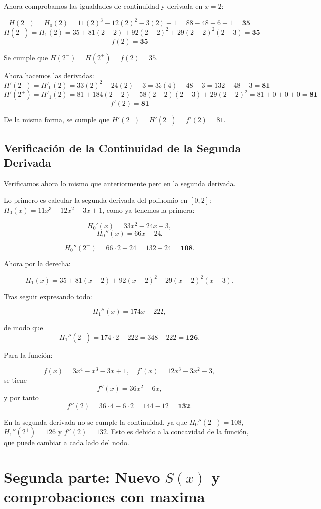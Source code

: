 \documentclass{article}
\begin{document}
Ahora comprobamos las igualdades de continuidad y derivada en \(x=2\):

$$ H(2^-) = H_0(2) = 11(2)^3 - 12(2)^2 - 3(2) + 1  = 88 - 48 - 6 + 1 = \mathbf{35} $$
$$ H(2^+) = H_1(2) = 35 + 81(2-2) + 92(2-2)^2 + 29(2-2)^2(2-3) =  \mathbf{35} $$
$$ f(2) = \mathbf{35} $$

Se cumple que \(H(2^-) = H(2^+) = f(2) = 35\).

Ahora hacemos las derivadas:
$$ H'(2^-) = H'_0(2) = 33(2)^2 - 24(2) - 3 = 33(4) - 48 - 3 = 132 - 48 - 3 = \mathbf{81} $$
$$ H'(2^+) = H'_1(2) = 81 + 184(2-2) + 58(2-2)(2-3) + 29(2-2)^2 = 81 + 0 + 0 + 0 = \mathbf{81} $$
$$ f'(2) = \mathbf{81} $$

De la misma forma, se cumple que \(H'(2^-) = H'(2^+) = f'(2) = 81\).

\subsection{Verificación de la Continuidad de la Segunda Derivada}

Verificamos ahora lo mismo que anteriormente pero en la segunda derivada.

Lo primero es calcular la segunda derivada del polinomio en \([0,2]\): \(H_0(x)=11x^3-12x^2-3x+1\), como ya tenemos la primera:

\[
H_0'(x)=33x^2-24x-3,
\]
\[
H_0''(x)=66x-24.
\]

\[
H_0''(2^-) = 66\cdot2 - 24 = 132 - 24 = \mathbf{108}.
\]

Ahora por la derecha:

\[
H_1(x) = 35 + 81(x-2) + 92(x-2)^2 + 29(x-2)^2(x-3).
\]

Tras seguir expresando todo:

\[
H_1''(x) = 174x - 222,
\]

de modo que
\[
H_1''(2^+) = 174\cdot2 - 222 = 348 - 222 = \mathbf{126}.
\]

Para la función:

\[
f(x) = 3x^4 - x^3 - 3x + 1,
\quad
f'(x) = 12x^3 - 3x^2 - 3,
\]
se tiene
\[
f''(x) = 36x^2 - 6x,
\]
y por tanto
\[
f''(2) = 36\cdot4 - 6\cdot2 = 144 - 12 = \mathbf{132}.
\]

En la segunda derivada no se cumple la continuidad, ya que \(H_0''(2^-) = 108\), \(H_1''(2^+) = 126\) y \(f''(2) = 132\). Esto es debido a la concavidad de la función, que puede cambiar a cada lado del nodo.


\section{Segunda parte: Nuevo $S(x)$ y comprobaciones con maxima }
\end{document}
